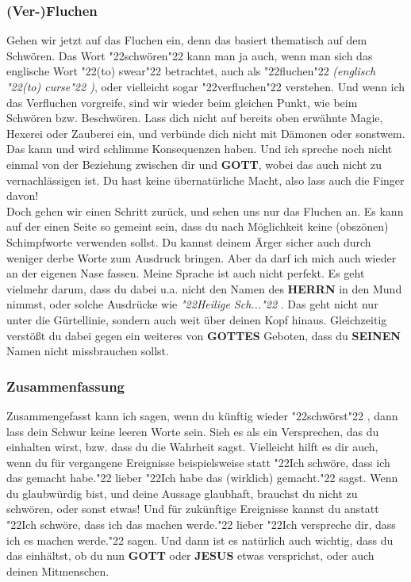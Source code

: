 \documentclass[10pt,a5paper]{article}
\newcommand{\Gottes}[0]{\textbf{GOTTES}}
\newcommand{\Gott}[0]{\textbf{GOTT}}
\newcommand{\Herrn}[0]{\textbf{HERRN}}
\newcommand{\Jesus}[0]{\textbf{JESUS}}
\newcommand{\Seinen}[0]{\textbf{SEINEN}}
\newcommand{\q}[1]{\char"22{#1}\char"22 }
\begin{document}
	\subsubsection{(Ver-)Fluchen}
		Gehen wir jetzt auf das Fluchen ein,
		denn das basiert thematisch auf dem Schw\"oren.
		Das Wort \q{schw\"oren} kann man ja auch,
		wenn man sich das englische Wort \q{(to) swear} betrachtet,
		auch als \q{fluchen} \textit{(englisch \q{(to) curse})},
		oder vielleicht sogar \q{verfluchen} verstehen.
		Und wenn ich das Verfluchen vorgreife,
		sind wir wieder beim gleichen Punkt,
		wie beim Schw\"oren bzw. Beschw\"oren.
		Lass dich nicht auf bereits oben erw\"ahnte Magie,
		Hexerei oder Zauberei ein,
		und verb\"unde dich nicht mit D\"amonen oder sonstwem.
		Das kann und wird schlimme Konsequenzen haben.
		Und ich spreche noch nicht einmal von der Beziehung zwischen dir und {\Gott},
		wobei das auch nicht zu vernachl\"assigen ist.
		Du hast keine \"ubernat\"urliche Macht,
		also lass auch die Finger davon!
		\\
		Doch gehen wir einen Schritt zur\"uck,
		und sehen uns nur das Fluchen an.
		Es kann auf der einen Seite so gemeint sein,
		dass du nach M\"oglichkeit keine (obsz\"onen) Schimpfworte verwenden sollst.
		Du kannst deinem \"Arger sicher auch durch weniger derbe Worte zum Ausdruck bringen.
		Aber da darf ich mich auch wieder an der eigenen Nase fassen.
		Meine Sprache ist auch nicht perfekt.
		Es geht vielmehr darum,
		dass du dabei u.a. nicht den Namen des {\Herrn} in den Mund nimmst,
		oder solche Ausdr\"ucke wie \textit{\q{Heilige Sch...}}.
		Das geht nicht nur unter die G\"urtellinie,
		sondern auch weit \"uber deinen Kopf hinaus.
		Gleichzeitig verst\"o{\ss}t du dabei gegen ein weiteres von {\Gottes} Geboten,
		dass du {\Seinen} Namen nicht missbrauchen sollst.
		
	\subsubsection{Zusammenfassung}
		Zusammengefasst kann ich sagen,
		wenn du k\"unftig wieder \q{schw\"orst},
		dann lass dein Schwur keine leeren Worte sein.
		Sieh es als ein Versprechen,
		das du einhalten wirst,
		bzw. dass du die Wahrheit sagst.
		Vielleicht hilft es dir auch,
		wenn du f\"ur vergangene Ereignisse beispielsweise statt
		\q{Ich schw\"ore, dass ich das gemacht habe.}
		lieber \q{Ich habe das (wirklich) gemacht.} sagst.
		Wenn du glaubw\"urdig bist,
		und deine Aussage glaubhaft,
		brauchst du nicht zu schw\"oren,
		oder sonst etwas!
		Und f\"ur zuk\"unftige Ereignisse kannst du anstatt \q{Ich schw\"ore, dass ich das machen werde.} lieber \q{Ich verspreche dir, dass ich es machen werde.} sagen.
		Und dann ist es nat\"urlich auch wichtig,
		dass du das einh\"altst,
		ob du nun {\Gott} oder {\Jesus} etwas versprichst,
		oder auch deinen Mitmenschen.
		
\end{document}
